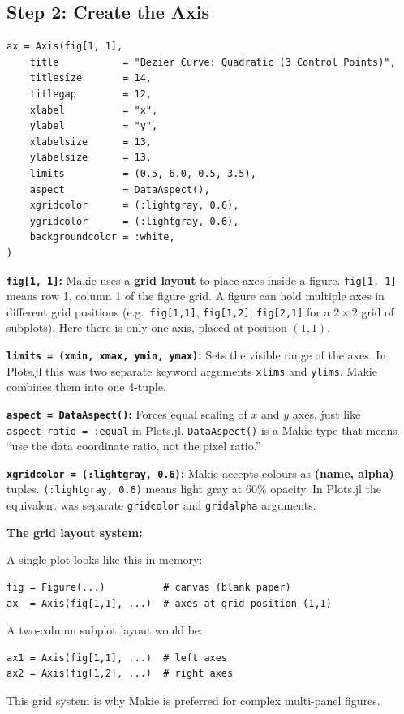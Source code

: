 \documentclass[12pt, a4paper]{article}
\newcommand{\cd}[1]{\texttt{#1}}
\begin{document}
\subsection{Step 2: Create the Axis}

\begin{verbatim}
ax = Axis(fig[1, 1],
    title           = "Bezier Curve: Quadratic (3 Control Points)",
    titlesize       = 14,
    titlegap        = 12,
    xlabel          = "x",
    ylabel          = "y",
    xlabelsize      = 13,
    ylabelsize      = 13,
    limits          = (0.5, 6.0, 0.5, 3.5),
    aspect          = DataAspect(),
    xgridcolor      = (:lightgray, 0.6),
    ygridcolor      = (:lightgray, 0.6),
    backgroundcolor = :white,
)
\end{verbatim}

\textbf{\cd{fig[1, 1]}:}
Makie uses a \textbf{grid layout} to place axes inside a figure.
\cd{fig[1, 1]} means row 1, column 1 of the figure grid.
A figure can hold multiple axes in different grid positions
(e.g.\ \cd{fig[1,1]}, \cd{fig[1,2]}, \cd{fig[2,1]} for a
$2 \times 2$ grid of subplots).
Here there is only one axis, placed at position $(1,1)$.

\textbf{\cd{limits = (xmin, xmax, ymin, ymax)}:}
Sets the visible range of the axes.
In Plots.jl this was two separate keyword arguments
\cd{xlims} and \cd{ylims}.
Makie combines them into one 4-tuple.

\textbf{\cd{aspect = DataAspect()}:}
Forces equal scaling of $x$ and $y$ axes, just like
\cd{aspect\_ratio = :equal} in Plots.jl.
\cd{DataAspect()} is a Makie type that means
``use the data coordinate ratio, not the pixel ratio.''

\textbf{\cd{xgridcolor = (:lightgray, 0.6)}:}
Makie accepts colours as \textbf{(name, alpha)} tuples.
\cd{(:lightgray, 0.6)} means light gray at 60\% opacity.
In Plots.jl the equivalent was separate \cd{gridcolor}
and \cd{gridalpha} arguments.

\begin{examplebox}
\textbf{The grid layout system:}

A single plot looks like this in memory:
\begin{verbatim}
fig = Figure(...)          # canvas (blank paper)
ax  = Axis(fig[1,1], ...)  # axes at grid position (1,1)
\end{verbatim}

A two-column subplot layout would be:
\begin{verbatim}
ax1 = Axis(fig[1,1], ...)  # left axes
ax2 = Axis(fig[1,2], ...)  # right axes
\end{verbatim}

This grid system is why Makie is preferred for complex
multi-panel figures.
\end{examplebox}
\end{document}
